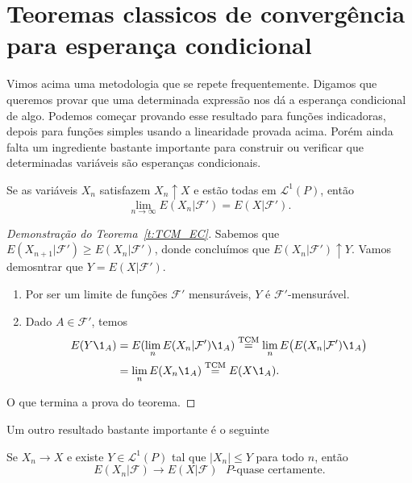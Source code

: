 \section{Teoremas classicos de convergência para esperança condicional}

Vimos acima uma metodologia que se repete frequentemente.
Digamos que queremos provar que uma determinada expressão nos dá a esperança condicional de algo.
Podemos começar provando esse resultado para funções indicadoras, depois para funções simples usando a linearidade provada acima.
Porém ainda falta um ingrediente bastante importante para construir ou verificar que determinadas variáveis são esperanças condicionais.

\begin{theorem}
  \label{t:TCM_EC}
  Se as variáveis $X_n$ satisfazem $X_n \uparrow X$ e estão todas em $\mathcal{L}^1(P)$, então
  \begin{equation}
    \lim_{n\to \infty} E(X_n|\mathcal{F}') = E(X|\mathcal{F}').
  \end{equation}
\end{theorem}

\begin{proof}[Demonstração do Teorema~\ref{t:TCM_EC}]
  Sabemos que $E(X_{n+1} | \mathcal{F}') \geq E(X_n|\mathcal{F}')$, donde concluímos que $E(X_n|\mathcal{F}') \uparrow Y$.
  Vamos demosntrar que $Y = E(X|\mathcal{F}')$.
  \begin{enumerate}[\quad a)]
  \item Por ser um limite de funções $\mathcal{F}'$ mensuráveis, $Y$ é $\mathcal{F}'$-mensurável.
  \item Dado $A \in \mathcal{F}'$, temos
    \begin{equation}
      \begin{split}
        E(Y \1_A) & = E(\lim_n E(X_n |\mathcal{F}') \1_A) \overset{\text{TCM}}= \lim_n E\big( E(X_n|\mathcal{F}') \1_A \big)\\
        & = \lim_n E(X_n \1_A) \overset{\text{TCM}}= E(X \1_A).
      \end{split}
    \end{equation}
  \end{enumerate}
  O que termina a prova do teorema.
\end{proof}

Um outro resultado bastante importante é o seguinte

\begin{theorem}
  Se $X_n \to X$ e existe $Y \in \mathcal{L}^1(P)$ tal que $|X_n| \leq Y$ para todo $n$, então
  \begin{equation}
    E(X_n | \mathcal{F}) \to E(X|\mathcal{F}) \text{ $P$-quase certamente.}
  \end{equation}
\end{theorem}

